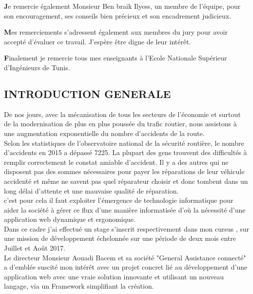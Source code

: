 \documentclass{article}
\begin{document}
\textbf{J}e remercie également Monsieur Ben braik Ilyess, un membre de l'équipe, pour son encouragement, ses conseils bien précieux et son encadrement judicieux.


\textbf{M}es remerciements s’adressent également aux membres du jury pour avoir accepté d’évaluer ce travail. J’espère être digne de leur intérêt.

\textbf{F}inalement je remercie tous mes enseignants à l’Ecole Nationale Supérieur d’Ingénieurs de Tunis.
\cleardoublepage
\tableofcontents
\cleardoublepage
\listoffigures
\cleardoublepage
\listoftables
\cleardoublepage
{}
\setcounter{page}{1}
\pagestyle{fancy}
\fancyhead[L]{}
\begin{center}
\section*{INTRODUCTION GENERALE}
\end{center}
\vspace*{0.3in}
De nos jours, avec la mécanisation de tous les secteurs de l'économie et surtout de la modernisation de plus en plus poussée du trafic routier, nous assistons à une augmentation exponentielle du nombre d'accidents de la route.
\\
Selon les statistiques de l’observatoire national de la sécurité routière, le nombre d'accidents en 2015 a dépassé 7225. La plupart des gens trouvent des difficultés à remplir correctement le constat amiable d'accident. Il y a des autres qui ne disposent pas des sommes nécessaires pour payer les réparations de leur véhicule accidenté et même ne savent pas quel réparateur choisir et donc tombent dans  un long délai d’attente et une mauvaise qualité de réparation. \\
c'est pour cela il faut exploiter l’émergence de technologie informatique pour aider la société à gérer ce flux d'une manière informatisée d’où la nécessité d’une application web dynamique et ergonomique.\\
Dans ce cadre j’ai effectué un stage s'inscrit respectivement dans mon cursus , sur une mission de développement échelonnée sur une période de deux mois entre Juillet et Août 2017.\\
Le directeur Monsieur Aouadi Bacem et sa société "General Assistance connecté"  a d'emblée suscité mon intérêt avec un projet concret lié au développement d’une application web avec une vraie solution innovante et utilisant un nouveau langage, via un Framework simplifiant la création. \\
\end{document}
